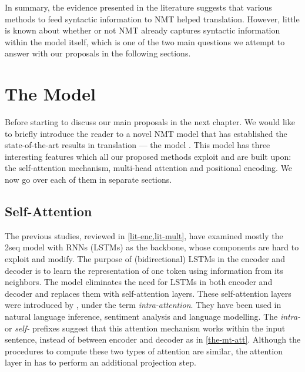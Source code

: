 In summary, the evidence presented in the literature suggests that various methods to feed syntactic information to NMT helped translation. However, little is known about whether or not NMT already captures syntactic information within the model itself, which is one of the two main questions we attempt to answer with our proposals in the following sections.

\section{The \transformer Model}
\label{lit-trans}

Before starting to discuss our main proposals in the next chapter. We would like to briefly introduce the reader to a novel NMT model that has established the state-of-the-art results in translation --- the \transformer model \citep{DBLP:conf/nips/VaswaniSPUJGKP17}.
This model has three interesting features which all our proposed methods exploit and are built upon: the self-attention mechanism, multi-head attention and positional encoding.
We now go over each of them in separate sections.

\subsection{Self-Attention}
\label{lit-trans-att}

The previous studies, reviewed in \cref{lit-enc,lit-mult}, have examined mostly the \seq2seq model with RNNs (LSTMs) as the backbone, whose components are hard to exploit and modify.
The purpose of (bidirectional) LSTMs in the encoder and decoder is to learn the representation of one token using information from its neighbors.
The \transformer model eliminates the need for LSTMs in both encoder and decoder and replaces them with self-attention layers.
These self-attention layers were introduced by \cite{cheng-dong-lapata:2016:EMNLP2016}, under the term \textit{intra-attention}.
They have been used in natural language inference, sentiment analysis and language modelling.
The \textit{intra-} or \textit{self-} prefixes suggest that this attention mechanism works within the input sentence, instead of between encoder and decoder as in \cref{the-mt-att}. Although the procedures to compute these two types of attention are similar, the attention layer in \transformer has to perform an additional projection step. 

